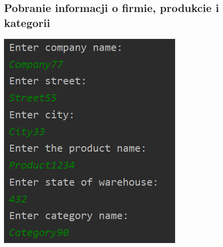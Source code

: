 \documentclass[a4paper, 11pt]{article}
\begin{document}
    \subsection{Pobranie informacji o firmie, produkcie i kategorii}
    \begin{center}
        \includegraphics[scale=1.3]{images/point9/addCompanyProductAndCategory.png}
    \end{center}
\end{document}
